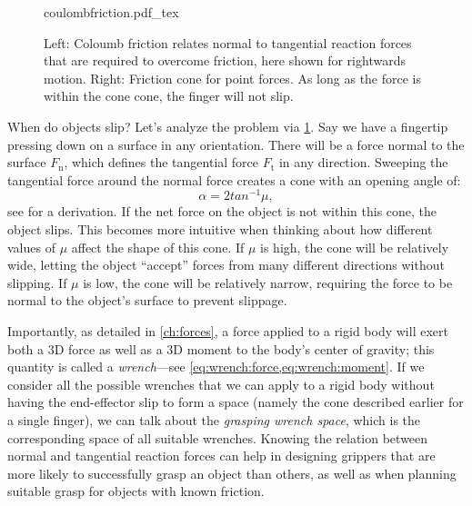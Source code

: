\begin{figure}
    \def\svgwidth{\textwidth}
    {coulombfriction.pdf_tex}
    \caption{Left: Coloumb friction relates normal to tangential reaction forces that are required to overcome friction, here shown for rightwards motion. Right: Friction cone for point forces. As long as the force is within the cone cone, the finger will not slip.}\label{fig:coulombfriction}
\end{figure}

When do objects slip? Let's analyze the problem via \cref{fig:coulombfriction}. Say we have a fingertip pressing down on a surface in any orientation. There will be a force normal to the surface $F_\mathrm{n}$, which defines the tangential force $F_\mathrm{t}$ in any direction. Sweeping the tangential force around the normal force creates a cone with an opening angle of:
\begin{equation}
\alpha=2tan^{-1}\mu,
\end{equation}
see \cite[p. 57]{rimon2019mechanics} for a derivation.
If the net force on the object is not within this cone, the object slips.  This becomes more intuitive when thinking about how different values of $\mu$ affect the shape of this cone. If $\mu$ is high, the cone will be relatively wide, letting the object ``accept'' forces from many different directions without slipping. If $\mu$ is low, the cone will be relatively narrow, requiring the force to be normal to the object's surface to prevent slippage.

Importantly, as detailed in \cref{ch:forces}, a force applied to a rigid body will exert both a 3D force as well as a 3D moment to the body's center of gravity; this quantity is called a \textsl{wrench}---see \cref{eq:wrench:force,eq:wrench:moment}. If we consider all the possible wrenches that we can apply to a rigid body without having the end-effector slip to form a space (namely the cone described earlier for a single finger), we can talk about the \textsl{grasping wrench space}, which is the corresponding space of all suitable wrenches.
%
Knowing the relation between normal and tangential reaction forces can help in designing grippers that are more likely to successfully grasp an object than others, as well as when planning suitable grasp for objects with known friction.


